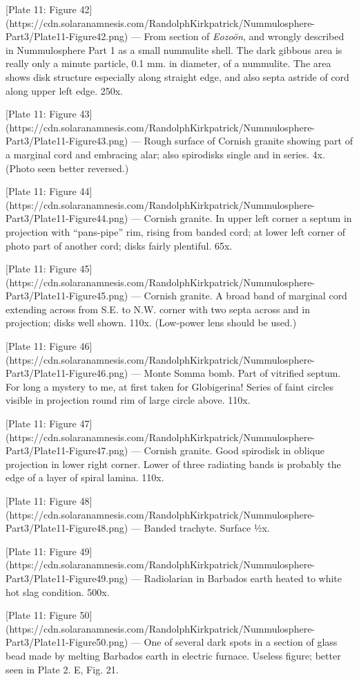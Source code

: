 \documentclass[a4paper, 12pt, oneside]{article}
\begin{document}
[Plate 11: Figure 42](https://cdn.solaranamnesis.com/RandolphKirkpatrick/Nummulosphere-Part3/Plate11-Figure42.png) --- From section of \emph{Eozoön}, and wrongly described in Nummulosphere Part 1 as a small nummulite shell. The dark gibbous area is really only a minute particle, 0.1 mm. in diameter, of a nummulite. The area shows disk structure especially along straight edge, and also septa astride of cord along upper left edge. 250x.

[Plate 11: Figure 43](https://cdn.solaranamnesis.com/RandolphKirkpatrick/Nummulosphere-Part3/Plate11-Figure43.png) --- Rough surface of Cornish granite showing part of a marginal cord and embracing alar; also spirodisks single and in series. 4x. (Photo seen better reversed.)

[Plate 11: Figure 44](https://cdn.solaranamnesis.com/RandolphKirkpatrick/Nummulosphere-Part3/Plate11-Figure44.png) --- Cornish granite. In upper left corner a septum in projection with ``pans-pipe'' rim, rising from banded cord; at lower left corner of photo part of another cord; disks fairly plentiful. 65x.

[Plate 11: Figure 45](https://cdn.solaranamnesis.com/RandolphKirkpatrick/Nummulosphere-Part3/Plate11-Figure45.png) --- Cornish granite. A broad band of marginal cord extending across from S.E. to N.W. corner with two septa across and in projection; disks well shown. 110x. (Low-power lens should be used.)

[Plate 11: Figure 46](https://cdn.solaranamnesis.com/RandolphKirkpatrick/Nummulosphere-Part3/Plate11-Figure46.png) --- Monte Somma bomb. Part of vitrified septum. For long a mystery to me, at first taken for Globigerina! Series of faint circles visible in projection round rim of large circle above. 110x.

[Plate 11: Figure 47](https://cdn.solaranamnesis.com/RandolphKirkpatrick/Nummulosphere-Part3/Plate11-Figure47.png) --- Cornish granite. Good spirodisk in oblique projection in lower right corner. Lower of three radiating bands is probably the edge of a layer of spiral lamina. 110x.

[Plate 11: Figure 48](https://cdn.solaranamnesis.com/RandolphKirkpatrick/Nummulosphere-Part3/Plate11-Figure48.png) --- Banded trachyte. Surface ½x.

[Plate 11: Figure 49](https://cdn.solaranamnesis.com/RandolphKirkpatrick/Nummulosphere-Part3/Plate11-Figure49.png) --- Radiolarian in Barbados earth heated to white hot slag condition. 500x.

[Plate 11: Figure 50](https://cdn.solaranamnesis.com/RandolphKirkpatrick/Nummulosphere-Part3/Plate11-Figure50.png) --- One of several dark spots in a section of glass bead made by melting Barbados earth in electric furnace. Useless figure; better seen in Plate 2. E, Fig. 21.
\end{document}
